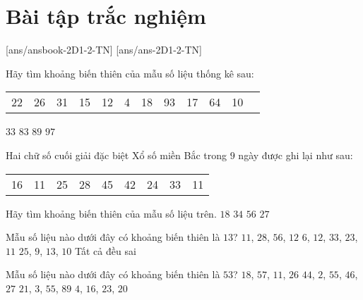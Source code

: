 \section*{Bài tập trắc nghiệm}

[ans/ansbook-2D1-2-TN]
[ans/ans-2D1-2-TN]
	\begin{ex}%
	Hãy tìm khoảng biến thiên của mẫu số liệu thống kê sau:
	\begin{longtable}{cccccccccccc}
		22 & 26 & 31 & 15 & 12 & 4 & 18
		& 93 & 17 & 64 & 10
	\end{longtable}
	\choice
	{$33$}
	{$83$}
	{\True $89$}
	{$97$}
\end{ex}

\begin{ex}%
	Hai chữ số cuối giải đặc biệt Xổ số miền Bắc trong $9$ ngày được ghi lại như sau:
	\begin{longtable}{ccccccccc}
		16 & 11 & 25 & 28 & 45 & 42 & 24 & 33 & 11
	\end{longtable}
	Hãy tìm khoảng biến thiên của mẫu số liệu trên.
	\choice
	{$18$}
	{\True $34$}
	{$56$}
	{$27$}
\end{ex}

\begin{ex}%
	Mẫu số liệu nào dưới đây có khoảng biến thiên là $13$?
	\choice
	{$11$, $28$, $56$, $12$}
	{$6$, $12$, $33$, $23$, $11$}
	{$25$, $9$, $13$, $10$}
	{\True Tất cả đều sai}
\end{ex}

\begin{ex}%
	Mẫu số liệu nào dưới đây có khoảng biến thiên là $53$?
	\choice
	{$18$, $57$, $11$, $26$}
	{\True $44$, $2$, $55$, $46$, $27$}
	{$21$, $3$, $55$, $89$}
	{$4$, $16$, $23$, $20$}
\end{ex}

